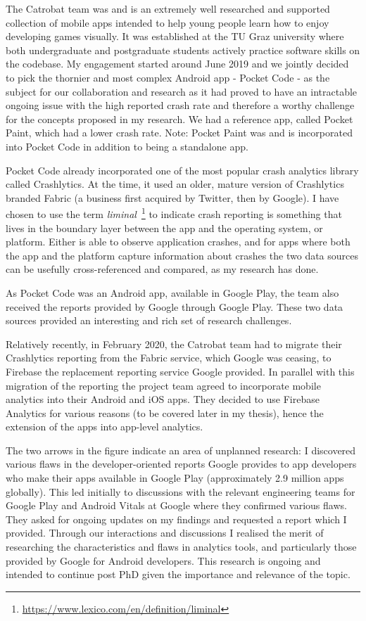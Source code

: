 The Catrobat team was and is an extremely well researched and supported collection of mobile apps intended to help young people learn how to enjoy developing games visually. It was established %
at the TU Graz university where both undergraduate and postgraduate students actively practice software skills on the codebase. My engagement started around June 2019 and we jointly decided to pick the thornier and most complex Android app - Pocket Code - as the subject for our collaboration and research as it had proved to have an intractable ongoing issue with the high reported crash rate and therefore a worthy challenge for the concepts proposed in my research. We had a reference app, called Pocket Paint, which had a lower crash rate. Note: Pocket Paint was and is incorporated into Pocket Code in addition to being a standalone app.

Pocket Code already incorporated one of the most popular crash analytics library called Crashlytics. At the time, it used an older, mature version of Crashlytics branded Fabric (a business first acquired by Twitter, then by Google). I have chosen to use the term \emph{liminal}~\footnote{\url{https://www.lexico.com/en/definition/liminal}} to indicate crash reporting is something that lives in the boundary layer between the app and the operating system, or platform. Either is able to observe application crashes, and for apps where both the app and the platform capture information about crashes the two data sources can be usefully cross-referenced and compared, as my research has done.

As Pocket Code was an Android app, available in Google Play, the team also received the reports provided by Google through Google Play. These two data sources provided an interesting and rich set of research challenges. 

Relatively recently, in February 2020, the Catrobat team had to migrate their Crashlytics reporting from the Fabric service, which Google was ceasing, to Firebase the replacement reporting service Google provided. In parallel with this migration of the reporting the project team agreed to incorporate mobile analytics into their Android and iOS apps. They decided to use Firebase Analytics for various reasons (to be covered later in my thesis), hence the extension of the apps into app-level analytics.

The two arrows in the figure indicate an area of unplanned research: 
%
I discovered various flaws in the developer-oriented reports Google provides to app developers who make their apps available in Google Play (approximately 2.9 million apps globally). This led initially to discussions with the relevant engineering teams for Google Play and Android Vitals at Google where they confirmed various flaws. They asked for ongoing updates on my findings and requested a report which I provided. Through our interactions and discussions I realised the merit of researching the characteristics and flaws in analytics tools, and particularly those provided by Google for Android developers. This research is ongoing and intended to continue post PhD given the importance and relevance of the topic.

